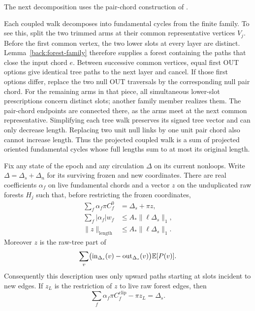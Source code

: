 The next decomposition uses the pair-chord construction of
\cite[Definitions~4.28 and~4.30 and Lemma~4.31]{IncrementalGraphs}.

Each coupled walk decomposes into fundamental cycles from the finite
family.  To see this, split the two trimmed arms at their common
representative vertices $V_j$.  Before the first common vertex, the
two lower slots at every layer are distinct.  Lemma~\ref{back:forest-family}
therefore supplies a forest containing the paths that close the input
chord $e$.  Between successive common vertices, equal first OUT
options give identical tree paths to the next layer and cancel.  If
those first options differ, replace the two null OUT traversals by
the corresponding null pair chord.  For the remaining arms in that
piece, all simultaneous lower-slot prescriptions concern distinct
slots; another family member realizes them.  The pair-chord endpoints
are connected there, as the arms meet at the next common representative.
Simplifying each tree walk preserves its signed tree vector and can
only decrease length.  Replacing two unit null links by one unit pair
chord also cannot increase length.  Thus the projected coupled walk
is a sum of projected oriented fundamental cycles whose full lengths
sum to at most its original length.

\begin{lemma}
\label{back:frozen-decomposition}
Fix any state of the epoch and any circulation $\Delta$ on its current
nonloops.  Write $\Delta=\Delta_s+\Delta_n$ for its surviving frozen
and new coordinates.  There are real coefficients $\alpha_f$ on live
fundamental chords and a vector $z$ on the unduplicated raw forests
$H_j$ such that, before restricting the frozen coordinates,
\begin{align}
 \sum_f\alpha_f\pi C_f^0&=\Delta_s+\pi z,
                                      \label{back:frozen-identity}\\
 \sum_f|\alpha_f|w_f&\le A_*\|\ell\Delta_s\|_1,
                                      \label{back:coefficient-bound}\\
 \|z\|_{\mathrm{length}}&\le A_*\|\ell\Delta_s\|_1.
                                      \label{back:raw-residual-bound}
\end{align}
Moreover $z$ is the raw-tree part of
\begin{equation}
\label{back:marginal-cancellation}
 \sum_v\bigl(\operatorname{in}_{\Delta_s}(v)
                  -\operatorname{out}_{\Delta_s}(v)\bigr)\mathbb E[P(v)].
\end{equation}
Consequently this description uses only upward paths starting at slots
incident to new edges.  If $z_L$ is the restriction of $z$ to live raw
forest edges, then
\begin{equation}
\label{back:clipped-identity}
             \sum_f\alpha_f\pi C_f^{\mathrm{clip}}-\pi z_L
                                  =\Delta_s.
\end{equation}
\end{lemma}

